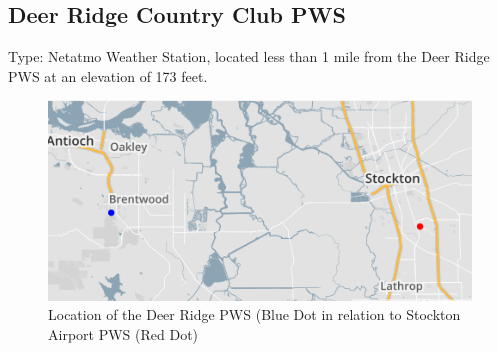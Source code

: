 \documentclass[sigconf]{acmart}
\begin{document}
\subsection{Deer Ridge Country Club PWS}

Type: Netatmo Weather Station, located less than 1 mile from the Deer Ridge PWS at an elevation of 173 feet.

\begin{figure}[htb]
    \centering
    \includegraphics[width=\columnwidth]{images/DR_Stockton.PNG}
    \caption{Location of the Deer Ridge PWS (Blue Dot in relation to Stockton Airport PWS (Red Dot)}
    \label{Image 1: Deer Ridge}
\end{figure}
\end{document}
